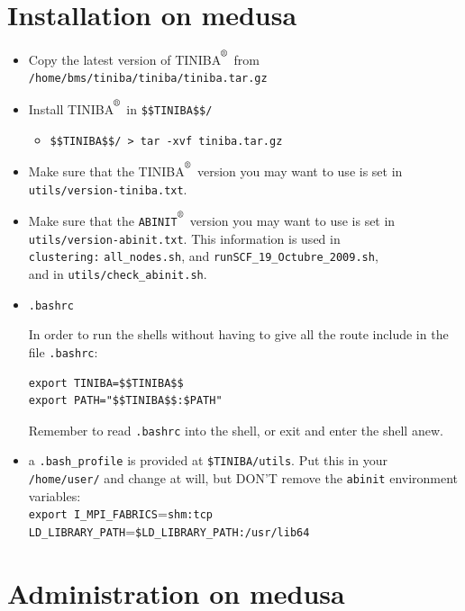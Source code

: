 \documentclass[openany,oneside]{book}
\def\reg{\textsuperscript{\textregistered}}
\numberwithin{equation}{section}
\begin{document}
\section{Installation  on medusa}
\begin{itemize}

\item Copy the latest version of TINIBA$^\reg$ from \\
\verb=/home/bms/tiniba/tiniba/tiniba.tar.gz=

\item Install TINIBA$^\reg$ in \verb=$$TINIBA$$/=
\begin{itemize}
\item  \verb=$$TINIBA$$/ > tar -xvf tiniba.tar.gz =
\end{itemize}
\item
Make sure that the TINIBA$^\reg$ version you may want to use is set
in \verb=utils/version-tiniba.txt=.

\item
  Make sure that the \verb=ABINIT=$^\reg$ version you may want to use is set
in \verb=utils/version-abinit.txt=.
 This information is used in\\ 
\verb=clustering:=
\verb=all_nodes.sh=, and
\verb=runSCF_19_Octubre_2009.sh=, \\and in
 \verb=utils/check_abinit.sh=.
\label{av}

\item\verb=.bashrc=

In order to run
the shells without having to give all
the route include in the file
 \verb=.bashrc=:
\begin{verbatim}
export TINIBA=$$TINIBA$$
export PATH="$$TINIBA$$:$PATH"
\end{verbatim}
Remember to read \verb=.bashrc= into the shell, or exit and enter the
shell anew.
\item a \verb=.bash_profile= is provided at \verb=$TINIBA/utils=. Put
  this in your \verb=/home/user/= and change at will, but DON'T remove
  the \verb=abinit= environment variables:\\
\verb=export I_MPI_FABRICS==\verb=shm:tcp=\\
\verb=LD_LIBRARY_PATH==\verb=$LD_LIBRARY_PATH:/usr/lib64=

\end{itemize}

\section{Administration  on medusa}
\end{document}

